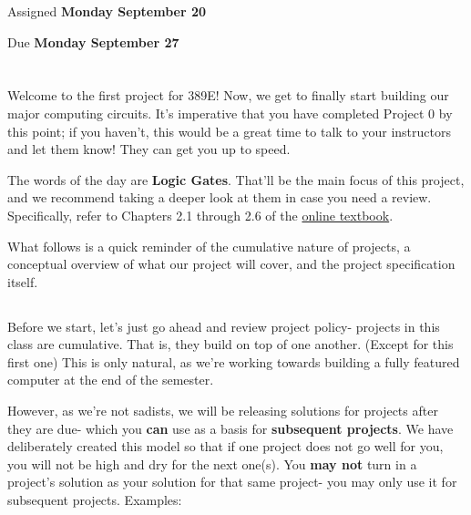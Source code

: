 \documentclass{article}
\begin{document}
\large

{\selectfont{\Huge CMSC389E Project 1: \par Arithmetic Logic Unit- Logic Gates}}

Assigned \textbf{Monday September 20}

Due \textbf{Monday September 27}

\section{\selectfont{The First (Real) Project}}

Welcome to the first project for 389E! Now, we get to finally start building our major computing circuits.
It's imperative that you have completed Project 0 by this point; if you haven't, this would be a great time to talk to your instructors and let them know! 
They can get you up to speed.

The words of the day are \textbf{Logic Gates}. That'll be the main focus of this project, and we recommend taking a deeper look at them in case you need a review. Specifically, refer to Chapters 2.1 through 2.6 of the \href{https://cmsc-389e.github.io/digital-logic-computer-architecture-minecraft/index.html}{online textbook}.

What follows is a quick reminder of the cumulative nature of projects, a conceptual overview of what our project will cover, and the project specification itself.

\subsection{\selectfont{Projects are Cumulative}}

Before we start, let's just go ahead and review project policy- projects in this class are cumulative. That is, they build on top of one another. (Except for this first one) This is only natural, as we're working towards building a fully featured computer at the end of the semester. 

However, as we're not sadists, we will be releasing solutions for projects after they are due- which you \textbf{can} use as a basis for \textbf{subsequent projects}. We have deliberately created this model so that if one project does not go well for you, you will not be high and dry for the next one(s). You \textbf{may not} turn in a project's solution as your solution for that same project- you may only use it for subsequent projects. Examples:
\end{document}
